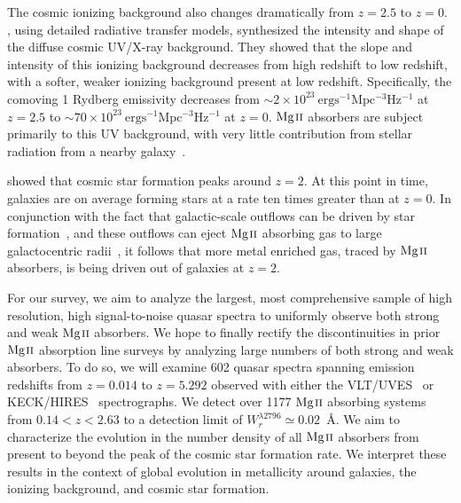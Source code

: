 \documentclass[iop,apj,numberedappendix,appendixfloats,twocolappendix]{emulateapj}
\begin{document}
The cosmic ionizing background also changes dramatically from $z = 2.5$ to $z = 0$. \cite{Haardt2012}, using detailed radiative transfer models, synthesized the intensity and shape of the diffuse cosmic UV/X-ray background. They showed that the slope and intensity of this ionizing background decreases from high redshift to low redshift, with a softer, weaker ionizing background present at low redshift. Specifically, the comoving 1 Rydberg emissivity decreases from $\sim2 \times 10^{23}~\mathrm{erg s^{-1} Mpc^{-3} Hz^{-1}}$ at $z = 2.5$ to $\sim70 \times 10^{23}~\mathrm{erg s^{-1} Mpc^{-3} Hz^{-1}}$ at $z = 0$. ${\hbox{{\rm Mg}\kern 0.1em{\sc ii}}}$ absorbers are subject primarily to this UV background, with very little contribution from stellar radiation from a nearby galaxy~\citep{Churchill1999,Charlton2000,Rigby2002}.

\cite{Behroozi2013sfr} showed that cosmic star formation peaks around $z = 2$. At this point in time, galaxies are on average forming stars at a rate ten times greater than at $z = 0$. In conjunction with the fact that galactic-scale outflows can be driven by star formation~\citep{Zhu2015}, and these outflows can eject ${\hbox{{\rm Mg}\kern 0.1em{\sc ii}}}$ absorbing gas to large galactocentric radii~\citep{Sharma2013,Kacprzak2012-PA,Nestor2011}, it follows that more metal enriched gas, traced by ${\hbox{{\rm Mg}\kern 0.1em{\sc ii}}}$ absorbers, is being driven out of galaxies at $z = 2$.

For our survey, we aim to analyze the largest, most comprehensive sample of high resolution, high signal-to-noise quasar spectra to uniformly observe both strong and weak ${\hbox{{\rm Mg}\kern 0.1em{\sc ii}}}$ absorbers. We hope to finally rectify the discontinuities in prior ${\hbox{{\rm Mg}\kern 0.1em{\sc ii}}}$ absorption line surveys by analyzing large numbers of both strong and weak absorbers. To do so, we will examine 602 quasar spectra spanning emission redshifts from $z = 0.014$ to $z = 5.292$ observed with either the VLT/UVES~\citep{Dekker2000} or KECK/HIRES~\citep{Vogt1994} spectrographs. We detect over 1177 ${\hbox{{\rm Mg}\kern 0.1em{\sc ii}}}$ absorbing systems from $0.14 < z < 2.63$ to a detection limit of $W_r^{\lambda2796} \simeq 0.02$~{\AA}. We aim to characterize the evolution in the number density of all ${\hbox{{\rm Mg}\kern 0.1em{\sc ii}}}$ absorbers from present to beyond the peak of the cosmic star formation rate. We interpret these results in the context of global evolution in metallicity around galaxies, the ionizing background, and cosmic star formation.
\end{document}
